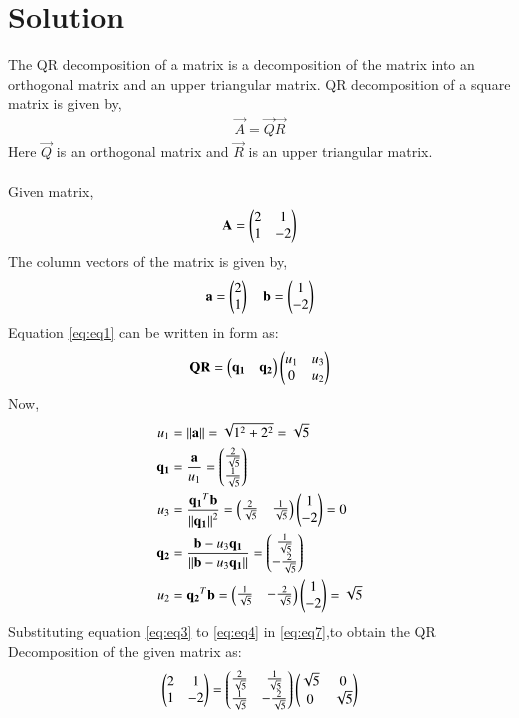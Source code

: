 \documentclass[journal,12pt,twocolumn]{IEEEtran}
\begin{document}
\section{Solution}
The QR decomposition  of a matrix is a decomposition of the matrix into an orthogonal matrix and an upper triangular matrix.
QR decomposition of a square matrix is given by,
\begin{align}
    \vec{A} = \vec{Q}\vec{R}
\end{align}
Here  $\vec{Q}$ is an orthogonal matrix and $\vec{R}$ is an upper triangular matrix.\\
\\
Given matrix,
\begin{align}
    \mathbf{A} = 
    \begin{pmatrix}2&1\\
    1&-2\end{pmatrix} \label{eq:eq1}
\end{align}
The column vectors of the matrix is given by,
\begin{align}
    \mathbf{a}=\begin{pmatrix}2\\1\end{pmatrix} \quad \mathbf{b}=\begin{pmatrix}1\\-2\end{pmatrix} \label{eq:eq2}
\end{align}
Equation \eqref{eq:eq1} can be written in  form as:
\begin{align}
    \mathbf{Q}\mathbf{R} = \begin{pmatrix}\mathbf{q_1}&\mathbf{q_2}\end{pmatrix} \begin{pmatrix}u_1&u_3\\0&u_2\end{pmatrix}  \label{eq:eq7}
\end{align}
Now, 
\begin{align}
u_1 &= \left\lVert\mathbf{a}\right\rVert = \sqrt{1^2+2^2} = \sqrt{5}\label{eq:eq3}\\
\mathbf{q_1} &= \frac{\mathbf{a}}{u_1} = \begin{pmatrix}\frac{2}{\sqrt{5}}\\ \frac{1}{\sqrt{5}}\end{pmatrix}\\
u_3 &= \frac{\mathbf{q_1}^T\mathbf{b}}{\left\lVert\mathbf{q_1}\right\rVert^2} = \begin{pmatrix}\frac{2}{\sqrt{5}}& \frac{1}{\sqrt{5}}\end{pmatrix}\begin{pmatrix}1\\-2\end{pmatrix} = 0\\
\mathbf{q_2} &= \frac{\mathbf{b} - u_3 \mathbf{q_1}}{\left\lVert\mathbf{b} - u_3 \mathbf{q_1}\right\rVert} = \begin{pmatrix}\frac{1}{\sqrt{5}}\\ -\frac{2}{\sqrt{5}}\end{pmatrix}\\
u_2 &= {\mathbf{q_2}^T\mathbf{b}} = \begin{pmatrix}\frac{1}{\sqrt{5}}&-\frac{2}{\sqrt{5}}\end{pmatrix}\begin{pmatrix}1\\-2\end{pmatrix}=\sqrt{5}\label{eq:eq4}
\end{align}
Substituting equation \eqref{eq:eq3} to \eqref{eq:eq4} in \eqref{eq:eq7},to obtain
the QR Decomposition of the given matrix as:
\begin{align}
    \begin{pmatrix}2&1\\1&-2\end{pmatrix} = \begin{pmatrix}\frac{2}{\sqrt{5}}&\frac{1}{\sqrt{5}}\\\frac{1}{\sqrt{5}}&-\frac{2}{\sqrt{5}}\end{pmatrix}\begin{pmatrix}\sqrt{5}&0\\0&{\sqrt{5}}\end{pmatrix}
\end{align}
\\
\end{document}
